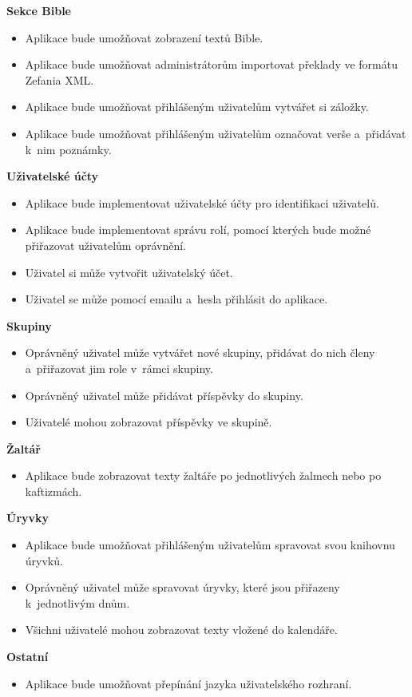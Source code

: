 \documentclass[
  tables=false,
  glossaries,
  index
]{kidiplom}
\begin{document}
\textbf{Sekce Bible}
\begin{itemize}
	\item Aplikace bude umožňovat zobrazení textů Bible.
	\item Aplikace bude umožňovat administrátorům importovat překlady ve formátu Zefania XML.
	\item Aplikace bude umožňovat přihlášeným uživatelům vytvářet si záložky.
	\item Aplikace bude umožňovat přihlášeným uživatelům označovat verše a~přidávat k~nim poznámky.
\end{itemize}
\textbf{Uživatelské účty}
\begin{itemize}
	\item Aplikace bude implementovat uživatelské účty pro identifikaci uživatelů.
	\item Aplikace bude implementovat správu rolí, pomocí kterých bude možné přiřazovat uživatelům oprávnění.
	\item Uživatel si může vytvořit uživatelský účet.
	\item Uživatel se může pomocí emailu a~hesla přihlásit do aplikace.
\end{itemize}
\textbf{Skupiny}
\begin{itemize}
	\item Oprávněný uživatel může vytvářet nové skupiny, přidávat do nich členy a~přiřazovat jim role v~rámci skupiny.
	\item Oprávněný uživatel může přidávat příspěvky do skupiny.
	\item Uživatelé mohou zobrazovat příspěvky ve skupině.
\end{itemize}
\textbf{Žaltář}
\begin{itemize}
	\item Aplikace bude zobrazovat texty žaltáře po jednotlivých žalmech nebo po kaftizmách.
\end{itemize}
\textbf{Úryvky}
\begin{itemize}
	\item Aplikace bude umožňovat přihlášeným uživatelům spravovat svou knihovnu úryvků.
	\item Oprávněný uživatel může spravovat úryvky, které jsou přiřazeny k~jednotlivým dnům.
	\item Všichni uživatelé mohou zobrazovat texty vložené do kalendáře.
\end{itemize}
\textbf{Ostatní}
\begin{itemize}
	\item Aplikace bude umožňovat přepínání jazyka uživatelského rozhraní.
\end{itemize}
\end{document}
